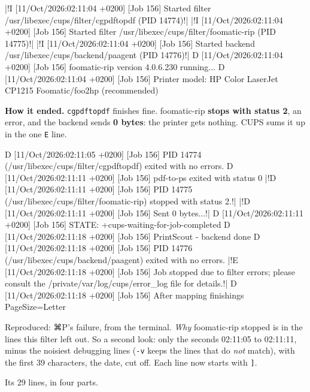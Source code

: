 \documentclass[11pt,a4paper]{article}
\begin{document}
\begin{cmdout}
|!I [11/Oct/2026:02:11:04 +0200] [Job 156] Started filter /usr/libexec/cups/filter/cgpdftopdf (PID 14774)!|
|!I [11/Oct/2026:02:11:04 +0200] [Job 156] Started filter /usr/libexec/cups/filter/foomatic-rip (PID 14775)!|
|!I [11/Oct/2026:02:11:04 +0200] [Job 156] Started backend /usr/libexec/cups/backend/paagent (PID 14776)!|
D [11/Oct/2026:02:11:04 +0200] [Job 156] foomatic-rip version 4.0.6.230 running...
D [11/Oct/2026:02:11:04 +0200] [Job 156] Printer model: HP Color LaserJet CP1215 Foomatic/foo2hp (recommended)
\end{cmdout}

\textbf{How it ended.} \texttt{cgpdftopdf} finishes fine. foomatic-rip \textbf{stops with status 2}, an error, and the backend sends \textbf{0 bytes}: the printer gets nothing. CUPS sums it up in the one \texttt{E} line.

\begin{cmdout}
D [11/Oct/2026:02:11:05 +0200] [Job 156] PID 14774 (/usr/libexec/cups/filter/cgpdftopdf) exited with no errors.
D [11/Oct/2026:02:11:11 +0200] [Job 156] pdf-to-ps exited with status 0
|!D [11/Oct/2026:02:11:11 +0200] [Job 156] PID 14775 (/usr/libexec/cups/filter/foomatic-rip) stopped with status 2.!|
|!D [11/Oct/2026:02:11:11 +0200] [Job 156] Sent 0 bytes...!|
D [11/Oct/2026:02:11:11 +0200] [Job 156] STATE: +cups-waiting-for-job-completed
D [11/Oct/2026:02:11:18 +0200] [Job 156] PrintScout - backend done
D [11/Oct/2026:02:11:18 +0200] [Job 156] PID 14776 (/usr/libexec/cups/backend/paagent) exited with no errors.
|!E [11/Oct/2026:02:11:18 +0200] [Job 156] Job stopped due to filter errors; please consult the /private/var/log/cups/error_log file for details.!|
D [11/Oct/2026:02:11:18 +0200] [Job 156] After mapping finishings PageSize=Letter
\end{cmdout}

Reproduced: ⌘P's failure, from the terminal. \emph{Why} foomatic-rip stopped is in the lines this filter left out. So a second look: only the seconds 02:11:05 to 02:11:11, minus the noisiest debugging lines (\texttt{-v} keeps the lines that do \emph{not} match), with the first 39 characters, the date, cut off. Each line now starts with \texttt{]}.

\begin{mine}
grep "\[Job 156\]" /var/log/cups/error_log | grep -E "02:11:(0[5-9]|1[01])" | grep -viE "^D.*(envp|argv|PPD|Option|\[0-9]+ bytes|Page)" | cut -c40-260 | tail -40
\end{mine}
Its 29 lines, in four parts.
\end{document}
